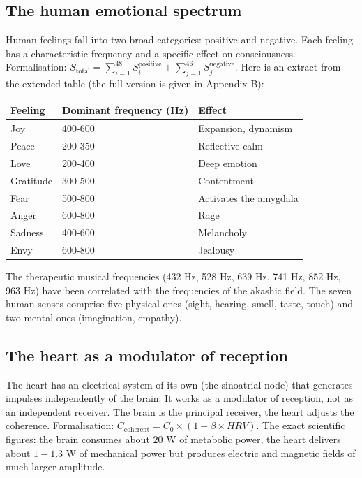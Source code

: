 \documentclass[11pt,a4paper]{article}
\begin{document}
\subsection{The human emotional spectrum}
Human feelings fall into two broad categories: positive and negative. Each feeling has a characteristic frequency and a specific effect on consciousness. Formalisation: $S_{\text{total}} = \sum_{i=1}^{48} S_i^{\text{positive}} + \sum_{j=1}^{46} S_j^{\text{negative}}$. Here is an extract from the extended table (the full version is given in Appendix B):
\begin{table}[H]
\centering
\begin{tabular}{@{}lll@{}}
\toprule
\textbf{Feeling} & \textbf{Dominant frequency (Hz)} & \textbf{Effect} \\ \midrule
Joy & 400-600 & Expansion, dynamism \\
Peace & 200-350 & Reflective calm \\
Love & 200-400 & Deep emotion \\
Gratitude & 300-500 & Contentment \\
Fear & 500-800 & Activates the amygdala \\
Anger & 600-800 & Rage \\
Sadness & 400-600 & Melancholy \\
Envy & 600-800 & Jealousy \\ \bottomrule
\end{tabular}
\end{table}
The therapeutic musical frequencies (432 Hz, 528 Hz, 639 Hz, 741 Hz, 852 Hz, 963 Hz) have been correlated with the frequencies of the akashic field. The seven human senses comprise five physical ones (sight, hearing, smell, taste, touch) and two mental ones (imagination, empathy).

\subsection{The heart as a modulator of reception}
The heart has an electrical system of its own (the sinoatrial node) that generates impulses independently of the brain. It works as a modulator of reception, not as an independent receiver. The brain is the principal receiver, the heart adjusts the coherence. Formalisation: $C_{\text{coherent}} = C_0 \times (1 + \beta \times HRV)$. The exact scientific figures: the brain consumes about $20$ W of metabolic power, the heart delivers about $1-1.3$ W of mechanical power but produces electric and magnetic fields of much larger amplitude.
\end{document}
